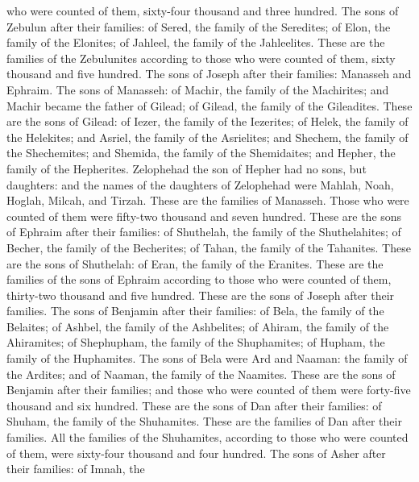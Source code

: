who were counted of them, sixty-four thousand and three hundred.
 The sons of Zebulun after their families: of Sered, the
family of the Seredites; of Elon, the family of the Elonites; of
Jahleel, the family of the Jahleelites.  These are the
families of the Zebulunites according to those who were counted of them,
sixty thousand and five hundred.  The sons of Joseph
after their families: Manasseh and Ephraim.  The sons of
Manasseh: of Machir, the family of the Machirites; and Machir became the
father of Gilead; of Gilead, the family of the Gileadites.
 These are the sons of Gilead: of Iezer, the family of
the Iezerites; of Helek, the family of the Helekites; 
and Asriel, the family of the Asrielites; and Shechem, the family of the
Shechemites;  and Shemida, the family of the Shemidaites;
and Hepher, the family of the Hepherites.  Zelophehad the
son of Hepher had no sons, but daughters: and the names of the daughters
of Zelophehad were Mahlah, Noah, Hoglah, Milcah, and Tirzah.
 These are the families of Manasseh. Those who were
counted of them were fifty-two thousand and seven hundred.
 These are the sons of Ephraim after their families: of
Shuthelah, the family of the Shuthelahites; of Becher, the family of the
Becherites; of Tahan, the family of the Tahanites.  These
are the sons of Shuthelah: of Eran, the family of the Eranites.
 These are the families of the sons of Ephraim according
to those who were counted of them, thirty-two thousand and five hundred.
These are the sons of Joseph after their families.  The
sons of Benjamin after their families: of Bela, the family of the
Belaites; of Ashbel, the family of the Ashbelites; of Ahiram, the family
of the Ahiramites;  of Shephupham, the family of the
Shuphamites; of Hupham, the family of the Huphamites. 
The sons of Bela were Ard and Naaman: the family of the Ardites; and of
Naaman, the family of the Naamites.  These are the sons
of Benjamin after their families; and those who were counted of them
were forty-five thousand and six hundred.  These are the
sons of Dan after their families: of Shuham, the family of the
Shuhamites. These are the families of Dan after their families.
 All the families of the Shuhamites, according to those
who were counted of them, were sixty-four thousand and four hundred.
 The sons of Asher after their families: of Imnah, the
